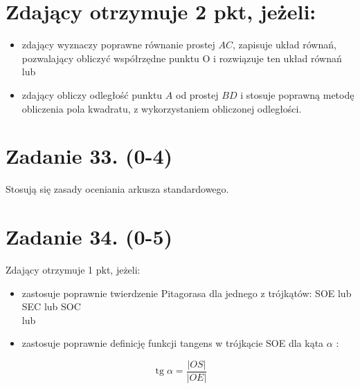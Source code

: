 \documentclass[10pt]{article}
\begin{document}
\section*{Zdający otrzymuje 2 pkt, jeżeli:}
\begin{itemize}
  \item zdający wyznaczy poprawne równanie prostej $A C$, zapisuje układ równań, pozwalający obliczyć współrzędne punktu O i rozwiązuje ten układ równań\\
lub
  \item zdający obliczy odległość punktu $A$ od prostej $B D$ i stosuje poprawną metodę obliczenia pola kwadratu, z wykorzystaniem obliczonej odległości.
\end{itemize}

\section*{Zadanie 33. (0-4)}
Stosują się zasady oceniania arkusza standardowego.

\section*{Zadanie 34. (0-5)}
Zdający otrzymuje 1 pkt, jeżeli:

\begin{itemize}
  \item zastosuje poprawnie twierdzenie Pitagorasa dla jednego z trójkątów: SOE lub SEC lub SOC\\
lub
  \item zastosuje poprawnie definicję funkcji tangens w trójkącie SOE dla kąta $\alpha$ :
\end{itemize}

$$
\operatorname{tg} \alpha=\frac{|O S|}{|O E|}
$$
\end{document}
